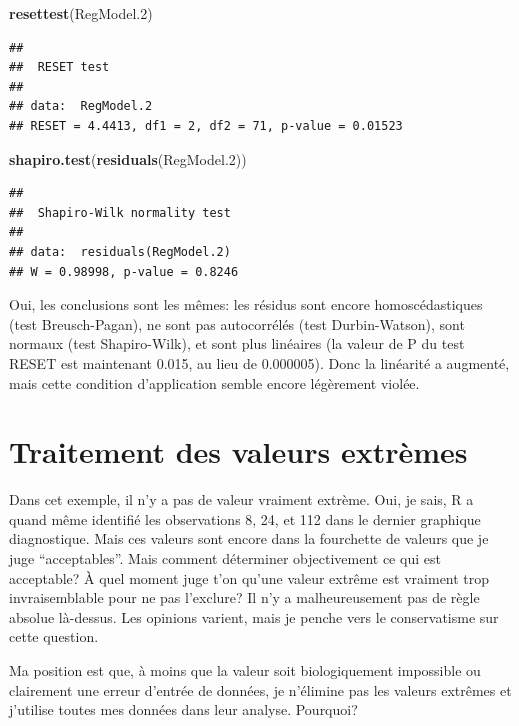 \documentclass[
  12pt,
]{book}
\newenvironment{Shaded}{\begin{snugshade}}{\end{snugshade}}
\newcommand{\FloatTok}[1]{\textcolor[rgb]{0.00,0.00,0.81}{#1}}
\newcommand{\KeywordTok}[1]{\textcolor[rgb]{0.13,0.29,0.53}{\textbf{#1}}}
\newcommand{\NormalTok}[1]{#1}
\begin{document}
\begin{Shaded}
\begin{Highlighting}[]
\KeywordTok{resettest}\NormalTok{(RegModel}\FloatTok{.2}\NormalTok{)}
\end{Highlighting}
\end{Shaded}

\begin{verbatim}
## 
##  RESET test
## 
## data:  RegModel.2
## RESET = 4.4413, df1 = 2, df2 = 71, p-value = 0.01523
\end{verbatim}

\begin{Shaded}
\begin{Highlighting}[]
\KeywordTok{shapiro.test}\NormalTok{(}\KeywordTok{residuals}\NormalTok{(RegModel}\FloatTok{.2}\NormalTok{))}
\end{Highlighting}
\end{Shaded}

\begin{verbatim}
## 
##  Shapiro-Wilk normality test
## 
## data:  residuals(RegModel.2)
## W = 0.98998, p-value = 0.8246
\end{verbatim}

Oui, les conclusions sont les mêmes: les résidus sont encore homoscédastiques (test Breusch-Pagan), ne sont pas autocorrélés (test Durbin-Watson), sont normaux (test Shapiro-Wilk), et sont plus linéaires (la valeur de P du test RESET est maintenant 0.015, au lieu de 0.000005). Donc la linéarité a augmenté, mais cette condition d'application semble encore légèrement violée.

\hypertarget{traitement-des-valeurs-extruxe8mes}{%
\section{Traitement des valeurs extrèmes}\label{traitement-des-valeurs-extruxe8mes}}

Dans cet exemple, il n'y a pas de valeur vraiment extrème. Oui, je sais, R a quand même identifié les observations 8, 24, et 112 dans le dernier graphique diagnostique. Mais ces valeurs sont encore dans la fourchette de valeurs que je juge ``acceptables''. Mais comment déterminer objectivement ce qui est acceptable? À quel moment juge t'on qu'une valeur extrême est vraiment trop invraisemblable pour ne pas l'exclure? Il n'y a malheureusement pas de règle absolue là-dessus. Les opinions varient, mais je penche vers le conservatisme sur cette question.

Ma position est que, à moins que la valeur soit biologiquement impossible ou clairement une erreur d'entrée de données, je n'élimine pas les valeurs extrêmes et j'utilise toutes mes données dans leur analyse. Pourquoi?
\end{document}
